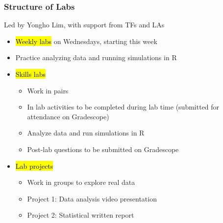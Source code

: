 \documentclass[slidestop,compress,mathserif]{beamer}
\begin{document}

\begin{frame}
	\frametitle{Structure of Labs} 
	Led by Yongho Lim, with support from TFs and LAs
	\begin{itemize}
		\item \hl{Weekly labs} on Wednesdays, starting this week
		\item Practice analyzing data and running simulations in R
		\item \hl{Skills labs}
		\begin{itemize}
			\item Work in pairs
			\item In lab activities to be completed during lab time (submitted for attendance on Gradescope)
			\item Analyze data and run simulations in R
			\item Post-lab questions to be submitted on Gradescope
		\end{itemize}
		\item \hl{Lab projects}
		\begin{itemize}
			\item Work in groups to explore real data
			\item Project 1: Data analysis video presentation
			\item Project 2: Statistical written report
		\end{itemize}
	\end{itemize}
\end{frame}

\end{document}
